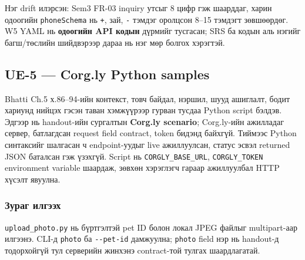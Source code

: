 \documentclass[
  mongolian,
]{article}
\begin{document}
Нэг drift илэрсэн: Sem3 FR-03 inquiry утсыг 8 цифр гэж шаарддаг, харин
одоогийн \texttt{phoneSchema} нь \texttt{+}, зай, \texttt{-} тэмдэг
оролцсон 8--15 тэмдэгт зөвшөөрдөг. W5 YAML нь \textbf{одоогийн API
кодын} дүрмийг тусгасан; SRS ба кодын аль нэгийг багш/төслийн шийдвэрээр
дараа нь нэг мөр болгох хэрэгтэй.

\subsection{UE-5 --- Corg.ly Python
samples}\label{ue-5-corg.ly-python-samples}

Bhatti Ch.5 х.86--94-ийн контекст, товч байдал, нэршил, шууд ашиглалт,
бодит хариунд нийцэх гэсэн таван хэмжүүрээр гурван тусдаа Python script
бэлдэв. Эдгээр нь handout-ийн сургалтын \textbf{Corg.ly scenario};
Corg.ly-ийн ажилладаг сервер, батлагдсан request field contract, token
бидэнд байхгүй. Тиймээс Python синтаксийг шалгасан ч endpoint-уудыг live
ажиллуулсан, статус эсвэл returned JSON баталсан гэж үзэхгүй. Script нь
\texttt{CORGLY\_BASE\_URL}, \texttt{CORGLY\_TOKEN} environment variable
шаардаж, зөвхөн хэрэглэгч гараар ажиллуулбал HTTP хүсэлт явуулна.

\subsubsection{Зураг
илгээх}\label{ux437ux443ux440ux430ux433-ux438ux43bux433ux44dux44dux445}

\texttt{upload\_photo.py} нь бүртгэлтэй pet ID болон локал JPEG файлыг
multipart-аар илгээнэ. CLI-д \texttt{photo} ба \texttt{-\/-pet-id}
дамжуулна; \texttt{photo} field нэр нь handout-д тодорхойгүй тул
серверийн жинхэнэ contract-той тулгах шаардлагатай.
\end{document}
